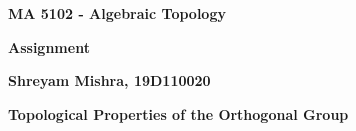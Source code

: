 \documentclass[a4paper,12pt]{article} %
\begin{document}



\thispagestyle{empty} %


\begin{center} %
	{\Large \bf MA 5102 - Algebraic Topology}
	\vspace{2mm} %
	
	\bf{Assignment} %
	
	\vspace{2mm}
	
	{\bf Shreyam Mishra, 19D110020} %
		
\end{center}  

\vspace*{0.3cm} 

\begin{center}
    \textbf{\large{Topological Properties of the Orthogonal Group}}
\end{center}


%




\end{document}
